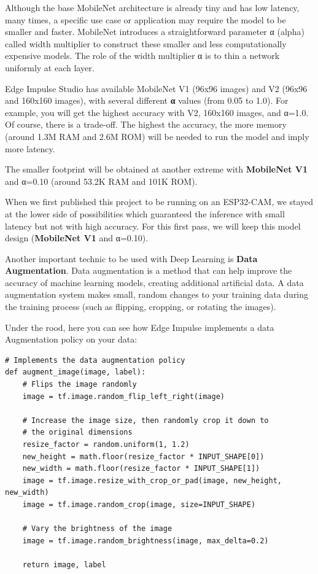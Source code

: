 \documentclass[
  letterpaper,
  DIV=11,
  numbers=noendperiod]{scrreprt}
\begin{document}
Although the base MobileNet architecture is already tiny and has low
latency, many times, a specific use case or application may require the
model to be smaller and faster. MobileNet introduces a straightforward
parameter α (alpha) called width multiplier to construct these smaller
and less computationally expensive models. The role of the width
multiplier α is to thin a network uniformly at each layer.

Edge Impulse Studio has available MobileNet V1 (96x96 images) and V2
(96x96 and 160x160 images), with several different \textbf{α} values
(from 0.05 to 1.0). For example, you will get the highest accuracy with
V2, 160x160 images, and α=1.0. Of course, there is a trade-off. The
highest the accuracy, the more memory (around 1.3M RAM and 2.6M ROM)
will be needed to run the model and imply more latency.

The smaller footprint will be obtained at another extreme with
\textbf{MobileNet V1} and α=0.10 (around 53.2K RAM and 101K ROM).

When we first published this project to be running on an ESP32-CAM, we
stayed at the lower side of possibilities which guaranteed the inference
with small latency but not with high accuracy. For this first pass, we
will keep this model design (\textbf{MobileNet V1} and α=0.10).

Another important technic to be used with Deep Learning is \textbf{Data
Augmentation}. Data augmentation is a method that can help improve the
accuracy of machine learning models, creating additional artificial
data. A data augmentation system makes small, random changes to your
training data during the training process (such as flipping, cropping,
or rotating the images).

Under the rood, here you can see how Edge Impulse implements a data
Augmentation policy on your data:

\begin{verbatim}
# Implements the data augmentation policy
def augment_image(image, label):
    # Flips the image randomly
    image = tf.image.random_flip_left_right(image)

    # Increase the image size, then randomly crop it down to
    # the original dimensions
    resize_factor = random.uniform(1, 1.2)
    new_height = math.floor(resize_factor * INPUT_SHAPE[0])
    new_width = math.floor(resize_factor * INPUT_SHAPE[1])
    image = tf.image.resize_with_crop_or_pad(image, new_height, new_width)
    image = tf.image.random_crop(image, size=INPUT_SHAPE)

    # Vary the brightness of the image
    image = tf.image.random_brightness(image, max_delta=0.2)

    return image, label
\end{verbatim}
\end{document}
